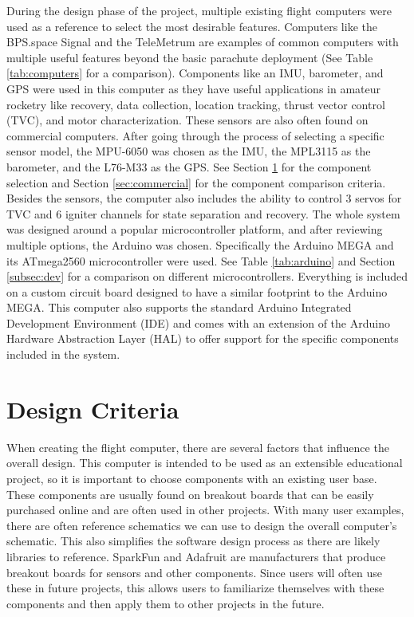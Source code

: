 \documentclass[conf]{new-aiaa}
\begin{document}
During the design phase of the project, multiple existing flight computers were used as a reference to select the most desirable features. Computers like the BPS.space Signal\cite{bpssignal} and the TeleMetrum\cite{telemetrumapogee} are examples of common computers with multiple useful features beyond the basic parachute deployment\cite{easyminiapogee} (See Table \ref{tab:computers} for a comparison). Components like an IMU, barometer, and GPS were used in this computer as they have useful applications in amateur rocketry like recovery, data collection, location tracking, thrust vector control (TVC), and motor characterization. These sensors are also often found on commercial computers. After going through the process of selecting a specific sensor model, the MPU-6050\cite{mpu6050} was chosen as the IMU, the MPL3115\cite{mpl3115} as the barometer, and the L76-M33 as the GPS\cite{l76m33}. See Section \ref{sec:design} for the component selection and Section \ref{sec:commercial} for the component comparison criteria. Besides the sensors, the computer also includes the ability to control 3 servos for TVC and 6 igniter channels for state separation and recovery. The whole system was designed around a popular microcontroller platform, and after reviewing multiple options, the Arduino was chosen. Specifically the Arduino MEGA and its ATmega2560 microcontroller\cite{megadescription} were used. See Table \ref{tab:arduino} and Section \ref{subsec:dev} for a comparison on different microcontrollers. Everything is included on a custom circuit board designed to have a similar footprint to the Arduino MEGA. This computer also supports the standard Arduino Integrated Development Environment (IDE) and comes with an extension of the Arduino Hardware Abstraction Layer (HAL) to offer support for the specific components included in the system.

\section{Design Criteria}
\label{sec:design}

 When creating the flight computer, there are several factors that influence the overall design. This computer is intended to be used as an extensible educational project, so it is important to choose components with an existing user base. These components are usually found on breakout boards that can be easily purchased online and are often used in other projects. With many user examples, there are often reference schematics we can use to design the overall computer's schematic. This also simplifies the software design process as there are likely libraries to reference. SparkFun and Adafruit are manufacturers that produce breakout boards for sensors and other components\cite{mpu6050sparkfun, bmp280adafruit}. Since users will often use these in future projects, this allows users to familiarize themselves with these components and then apply them to other projects in the future. 
\end{document}
